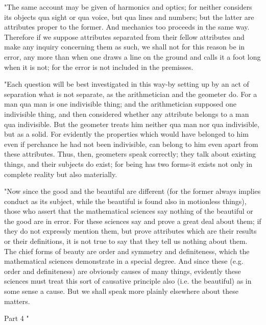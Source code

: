 "The same account may be given of harmonics and optics; for neither
considers its objects qua sight or qua voice, but qua lines and numbers;
but the latter are attributes proper to the former. And mechanics
too proceeds in the same way. Therefore if we suppose attributes separated
from their fellow attributes and make any inquiry concerning them
as such, we shall not for this reason be in error, any more than when
one draws a line on the ground and calls it a foot long when it is
not; for the error is not included in the premisses. 

"Each question will be best investigated in this way-by setting up
by an act of separation what is not separate, as the arithmetician
and the geometer do. For a man qua man is one indivisible thing; and
the arithmetician supposed one indivisible thing, and then considered
whether any attribute belongs to a man qua indivisible. But the geometer
treats him neither qua man nor qua indivisible, but as a solid. For
evidently the properties which would have belonged to him even if
perchance he had not been indivisible, can belong to him even apart
from these attributes. Thus, then, geometers speak correctly; they
talk about existing things, and their subjects do exist; for being
has two forms-it exists not only in complete reality but also materially.

"Now since the good and the beautiful are different (for the former
always implies conduct as its subject, while the beautiful is found
also in motionless things), those who assert that the mathematical
sciences say nothing of the beautiful or the good are in error. For
these sciences say and prove a great deal about them; if they do not
expressly mention them, but prove attributes which are their results
or their definitions, it is not true to say that they tell us nothing
about them. The chief forms of beauty are order and symmetry and definiteness,
which the mathematical sciences demonstrate in a special degree. And
since these (e.g. order and definiteness) are obviously causes of
many things, evidently these sciences must treat this sort of causative
principle also (i.e. the beautiful) as in some sense a cause. But
we shall speak more plainly elsewhere about these matters.

Part 4 "

